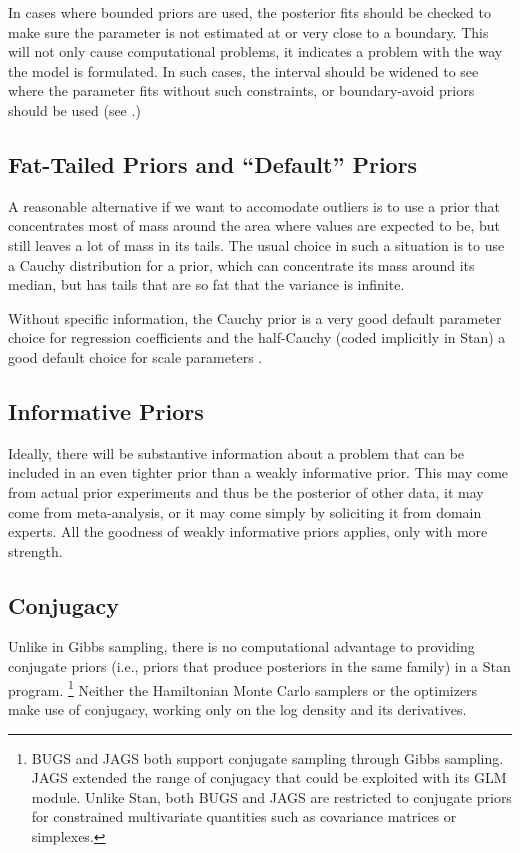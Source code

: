In cases where bounded priors are used, the posterior fits should be
checked to make sure the parameter is not estimated at or very close
to a boundary.  This will not only cause computational problems, it
indicates a problem with the way the model is formulated.  In such
cases, the interval should be widened to see where the parameter fits
without such constraints, or boundary-avoid priors should be used (see
.)

\subsection{Fat-Tailed Priors and ``Default'' Priors}

A reasonable alternative if we want to accomodate outliers is to use a
prior that concentrates most of mass around the area where values are
expected to be, but still leaves a lot of mass in its tails.  The
usual choice in such a situation is to use a Cauchy distribution for a
prior, which can concentrate its mass around its median, but has tails
that are so fat that the variance is infinite.  

Without specific information, the Cauchy prior is a very good default
parameter choice for regression coefficients
\citep{GelmanJakulinPittauEtAl:2008} and the half-Cauchy (coded
implicitly in Stan) a good default choice for scale parameters
\citep{Gelman:2006}.



\subsection{Informative Priors}

Ideally, there will be substantive information about a problem that
can be included in an even tighter prior than a weakly informative
prior.  This may come from actual prior experiments and thus be the
posterior of other data, it may come from meta-analysis, or it may
come simply by soliciting it from domain experts.  All the goodness of
weakly informative priors applies, only with more strength.

\subsection{Conjugacy}

Unlike in Gibbs sampling, there is no computational advantage to
providing conjugate priors (i.e., priors that produce posteriors in
the same family) in a Stan program.%
%
\footnote{BUGS and JAGS both support conjugate sampling through Gibbs
  sampling.  JAGS extended the range of conjugacy that could be
  exploited with its GLM module.  Unlike Stan, both BUGS and JAGS are
  restricted to conjugate priors for constrained multivariate
  quantities such as covariance matrices or simplexes.}
%
Neither the Hamiltonian Monte Carlo samplers or the optimizers make
use of conjugacy, working only on the log density and its derivatives.



